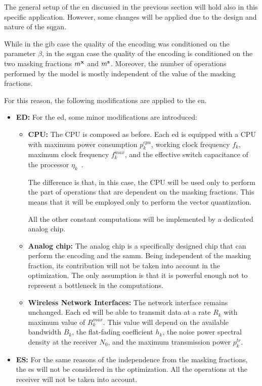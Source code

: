 The general setup of the \gls{en} discussed in the previous section will hold also in this specific application. However, some changes will be applied due to the design and nature of the \gls{sqgan}.

While in the \gls{gib} case the quality of the encoding was conditioned on the parameter $\beta$, in the \gls{sqgan} case the quality of the encoding is conditioned on the two masking fractions $m^{\mathbf{x}}$ and $m^{\mathbf{s}}$. Moreover, the number of operations performed by the model is mostly independent of the value of the masking fractions.

For this reason, the following modifications are applied to the \gls{en}. 
\begin{itemize}[label={}] 
    \item \textbf{ED:} For the \gls{ed}, some minor modifications are introduced: 
    \begin{itemize}[label={}] 
        \item \textbf{CPU:} The CPU is composed as before. Each \gls{ed} is equipped with a CPU with maximum power consumption $p_k^{cpu}$, working clock frequency $f_k$, maximum clock frequency $f_k^{max}$, and the effective switch capacitance of the processor $\eta_k$~\cite{Burd1996EffSwithc}.
        
        The difference is that, in this case, the CPU will be used only to perform the part of operations that are dependent on the masking fractions. This means that it will be employed only to perform the vector quantization.

        All the other constant computations will be implemented by a dedicated analog chip.

        \item \textbf{Analog chip:} The analog chip is a specifically designed chip that can perform the encoding and the \gls{samm}. Being independent of the masking fraction, its contribution will not be taken into account in the optimization. The only assumption is that it is powerful enough not to represent a bottleneck in the computations.

        \item \textbf{Wireless Network Interfaces:} The network interface remains unchanged. Each \gls{ed} will be able to transmit data at a rate $R_k$ with maximum value of $R_k^{max}$. This value will depend on the available bandwidth $B_k$, the flat-fading coefficient $h_k$, the noise power spectral density at the receiver $N_0$, and the maximum transmission power $p_k^{tr}$.
    \end{itemize}
    \item \textbf{ES:} For the same reasons of the independence from the masking fractions, the \gls{es} will not be considered in the optimization. All the operations at the receiver will not be taken into account.
\end{itemize}

